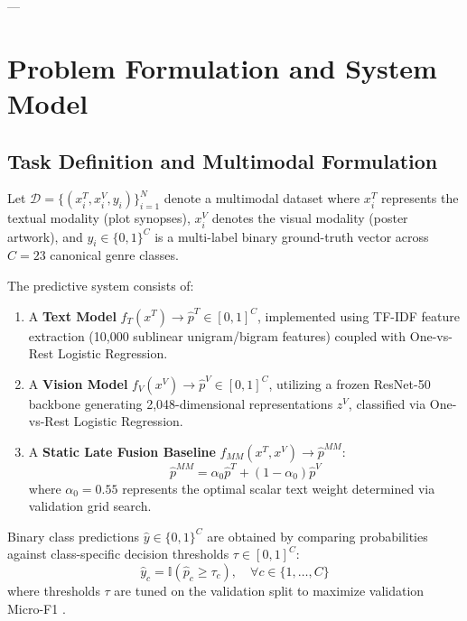 \documentclass[journal]{IEEEtran}
\begin{document}
---

\section{Problem Formulation and System Model}

\subsection{Task Definition and Multimodal Formulation}
Let $\mathcal{D} = \{(x_i^T, x_i^V, y_i)\}_{i=1}^N$ denote a multimodal dataset where $x_i^T$ represents the textual modality (plot synopses), $x_i^V$ denotes the visual modality (poster artwork), and $y_i \in \{0, 1\}^C$ is a multi-label binary ground-truth vector across $C = 23$ canonical genre classes.

The predictive system consists of:
\begin{enumerate}
    \item A \textbf{Text Model} $f_T(x^T) \to \hat{p}^T \in [0, 1]^C$, implemented using TF-IDF feature extraction (10,000 sublinear unigram/bigram features) coupled with One-vs-Rest Logistic Regression.
    \item A \textbf{Vision Model} $f_V(x^V) \to \hat{p}^V \in [0, 1]^C$, utilizing a frozen ResNet-50 backbone \cite{he2016deep} generating 2,048-dimensional representations $z^V$, classified via One-vs-Rest Logistic Regression.
    \item A \textbf{Static Late Fusion Baseline} $f_{MM}(x^T, x^V) \to \hat{p}^{MM}$:
    \begin{equation}
        \hat{p}^{MM} = \alpha_0 \hat{p}^T + (1 - \alpha_0) \hat{p}^V
    \end{equation}
    where $\alpha_0 = 0.55$ represents the optimal scalar text weight determined via validation grid search.
\end{enumerate}

Binary class predictions $\hat{y} \in \{0, 1\}^C$ are obtained by comparing probabilities against class-specific decision thresholds $\tau \in [0, 1]^C$:
\begin{equation}
    \hat{y}_c = \mathbb{I}(\hat{p}_c \ge \tau_c), \quad \forall c \in \{1, \dots, C\}
\end{equation}
where thresholds $\tau$ are tuned on the validation split to maximize validation Micro-F1 \cite{tsoumakas2010mining}.
\end{document}
